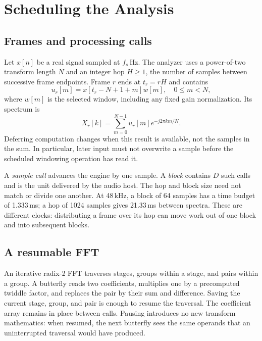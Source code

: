 \section{Scheduling the Analysis}
\label{sec:method}
\subsection{Frames and processing calls}
Let $x[n]$ be a real signal sampled at $f_s$\,Hz. The analyzer uses a
power-of-two transform length $N$ and an integer hop $H\ge1$, the number of
samples between successive frame endpoints. Frame $r$ ends at $t_r=rH$ and
contains
\begin{equation}
 u_r[m]=x[t_r-N+1+m]w[m],\quad 0\le m<N,
 \label{eq:frame}
\end{equation}
where $w[m]$ is the selected window, including any fixed gain normalization.
Its spectrum is
\begin{equation}
 X_r[k]=\sum_{m=0}^{N-1}u_r[m]e^{-j2\pi km/N}.
 \label{eq:dft}
\end{equation}
Deferring computation changes when this result is available, not the samples
in the sum. In particular, later input must not overwrite a sample before the
scheduled windowing operation has read it.

A \emph{sample call} advances the engine by one sample. A \emph{block}
contains $D$ such calls and is the unit delivered by the audio host. The hop
and block size need not match or divide one another. At 48\,kHz, a block of
64 samples has a time budget of 1.333\,ms; a hop of 1024 samples gives
21.33\,ms between spectra. These are different clocks: distributing a frame
over its hop can move work out of one block and into subsequent blocks.



\subsection{A resumable FFT}
An iterative radix-2 FFT traverses stages, groups within a stage, and pairs
within a group. A butterfly reads two coefficients, multiplies one by a
precomputed twiddle factor, and replaces the pair by their sum and difference.
Saving the current stage, group, and pair is enough to resume the traversal.
The coefficient array remains in place between calls. Pausing introduces no
new transform mathematics: when resumed, the next butterfly sees the same
operands that an uninterrupted traversal would have produced.

